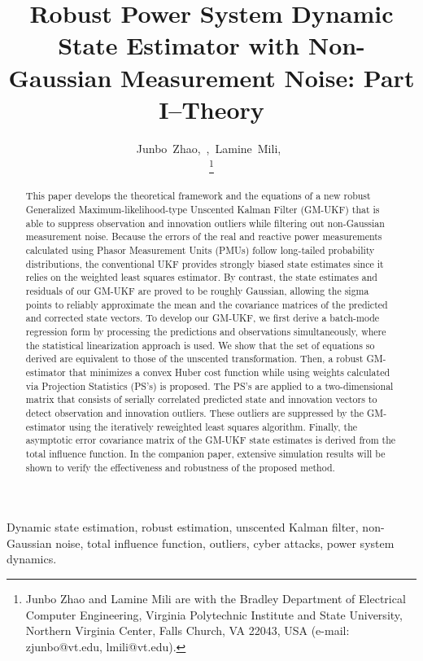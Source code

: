 \documentclass[10pt]{IEEEtran}
\begin{document}
\title{Robust Power System Dynamic State Estimator with Non-Gaussian Measurement Noise: Part I--Theory}
\author{Junbo~Zhao,~,~Lamine~Mili,~\\

\thanks{Junbo Zhao and Lamine Mili are with the Bradley Department of Electrical Computer Engineering,
Virginia Polytechnic Institute and State University, Northern Virginia Center, Falls Church, VA 22043, USA (e-mail: zjunbo@vt.edu, lmili@vt.edu).}}
\maketitle

\begin{abstract}
This paper develops the theoretical framework and the equations of a new robust Generalized Maximum-likelihood-type Unscented Kalman Filter (GM-UKF) that is able to suppress observation and innovation outliers while filtering out non-Gaussian measurement noise. Because the errors of the real and reactive power measurements calculated using Phasor Measurement Units (PMUs) follow long-tailed probability distributions, the conventional UKF provides strongly biased state estimates since it relies on the weighted least squares estimator. By contrast, the state estimates and residuals of our GM-UKF are proved to be roughly Gaussian, allowing the sigma points to reliably approximate the mean and the covariance matrices of the predicted and corrected state vectors. To develop our GM-UKF, we first derive a batch-mode regression form by processing the predictions and observations simultaneously, where the statistical linearization approach is used. We show that the set of equations so derived are equivalent to those of the unscented transformation. Then, a robust GM-estimator that minimizes a convex Huber cost function while using weights calculated via Projection Statistics (PS's) is proposed. The PS's are applied to a two-dimensional matrix that consists of serially correlated predicted state and innovation vectors to detect observation and innovation outliers. These outliers are suppressed by the GM-estimator using the iteratively reweighted least squares algorithm. Finally, the asymptotic error covariance matrix of the GM-UKF state estimates is derived from the total influence function. In the companion paper, extensive simulation results will be shown to verify the effectiveness and robustness of the proposed method.
\end{abstract}
\vspace{-0.2cm}
\begin{IEEEkeywords}
Dynamic state estimation, robust estimation, unscented Kalman filter, non-Gaussian noise, total influence function, outliers, cyber attacks, power system dynamics.
\end{IEEEkeywords}
\end{document}
